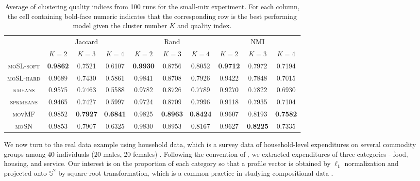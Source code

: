 \documentclass[10pt]{article}
\newcommand{\bbS}{\mathbb{S}}
\begin{document}
\begin{table}[h]
	\caption{Average of clustering quality indices from 100 runs for the \textsf{small-mix} experiment. For each column, the cell containing bold-face numeric indicates that the corresponding row is the best performing model given the cluster number $K$ and quality index.}
	\label{table:small_mix}
	\vskip-0.3cm
	\smallskip
	\centering\small
	\begin{tabular}{cccccccccc}
		\hline
		\multirow{2}{*}{} & \multicolumn{3}{c}{Jaccard} & \multicolumn{3}{c}{Rand} & \multicolumn{3}{c}{NMI} \\ \cline{2-10} 
		& $K=2$     & $K=3$    & $K=4$    & $K=2$      & $K=3$     & $K=4$     & $K=2$   & $K=3$   & $K=4$    \\ \hline
		\textsc{moSL-soft} & \textbf{0.9862} & 0.7521 & 0.6107 & \textbf{0.9930} & 0.8756 & 0.8052 & \textbf{0.9712} & 0.7972 & 0.7194 \\ 
		\textsc{moSL-hard} & 0.9689 & 0.7430 & 0.5861 & 0.9841 & 0.8708 & 0.7926 & 0.9422 & 0.7848 & 0.7015 \\ 
		\textsc{kmeans} & 0.9575 & 0.7463 & 0.5588 & 0.9782 & 0.8726 & 0.7789 & 0.9270 & 0.7822 & 0.6930 \\ 
		\textsc{spkmeans} & 0.9465 & 0.7427 & 0.5997 & 0.9724 & 0.8709 & 0.7996 & 0.9118 & 0.7935 & 0.7104 \\ 
		\textsc{movMF} & 0.9852 & \textbf{0.7927} & \textbf{0.6841} & 0.9825 & \textbf{0.8963} & \textbf{0.8424} & 0.9607 & 0.8193 & \textbf{0.7582} \\ 
		\textsc{moSN} & 0.9853 & 0.7907 & 0.6325 & 0.9830 & 0.8953 & 0.8167 & 0.9627 & \textbf{0.8225} & 0.7335 \\  \hline
	\end{tabular}
\end{table}



We now turn to the real data example using \textsf{household} data, which is a survey data of household-level expenditures on several commodity groups among 40 individuals (20 males, 20 females) \cite{everitt_2010_HandbookStatisticalAnalyses}. Following the convention of \cite{hornik_2014_MovMFPackageFitting}, we extracted expenditures of three categories - food, housing, and service. Our interest is on the proportion of each category so that a profile vector is obtained by $\ell_1$ normalization and projected onto $\bbS^2$ by square-root transformation, which is a common practice in studying compositional data \cite{marron_2021_ObjectOrientedData}.
\end{document}
